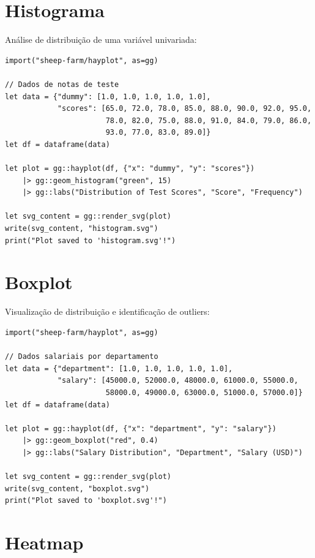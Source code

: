 \documentclass[12pt, a4paper, oneside]{book}
\begin{document}
\section{Histograma}

Análise de distribuição de uma variável univariada:

\begin{lstlisting}[caption={examples/histogram.hay}]
import("sheep-farm/hayplot", as=gg)

// Dados de notas de teste
let data = {"dummy": [1.0, 1.0, 1.0, 1.0, 1.0],
            "scores": [65.0, 72.0, 78.0, 85.0, 88.0, 90.0, 92.0, 95.0,
                       78.0, 82.0, 75.0, 88.0, 91.0, 84.0, 79.0, 86.0,
                       93.0, 77.0, 83.0, 89.0]}
let df = dataframe(data)

let plot = gg::hayplot(df, {"x": "dummy", "y": "scores"})
    |> gg::geom_histogram("green", 15)
    |> gg::labs("Distribution of Test Scores", "Score", "Frequency")

let svg_content = gg::render_svg(plot)
write(svg_content, "histogram.svg")
print("Plot saved to 'histogram.svg'!")
\end{lstlisting}

\section{Boxplot}

Visualização de distribuição e identificação de outliers:

\begin{lstlisting}[caption={examples/boxplot.hay}]
import("sheep-farm/hayplot", as=gg)

// Dados salariais por departamento
let data = {"department": [1.0, 1.0, 1.0, 1.0, 1.0],
            "salary": [45000.0, 52000.0, 48000.0, 61000.0, 55000.0,
                       58000.0, 49000.0, 63000.0, 51000.0, 57000.0]}
let df = dataframe(data)

let plot = gg::hayplot(df, {"x": "department", "y": "salary"})
    |> gg::geom_boxplot("red", 0.4)
    |> gg::labs("Salary Distribution", "Department", "Salary (USD)")

let svg_content = gg::render_svg(plot)
write(svg_content, "boxplot.svg")
print("Plot saved to 'boxplot.svg'!")
\end{lstlisting}

\section{Heatmap}
\end{document}

